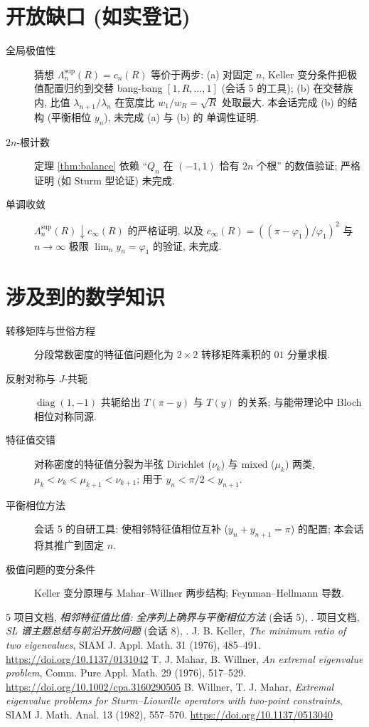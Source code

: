 \documentclass[UTF8]{ctexart}
\begin{document}
\section{开放缺口 (如实登记)}

\begin{description}
	\item[全局极值性] 猜想 $\Lambda_n^{\sup}(R) = c_n(R)$ 等价于两步:
		(a) 对固定 $n$, Keller 变分条件把极值配置归约到交替 bang-bang
		$[1,R,\dots,1]$ (会话 5 的工具); (b) 在交替族内, 比值
		$\lambda_{n+1}/\lambda_n$ 在宽度比 $w_1/w_R = \sqrt R$ 处取最大.
		本会话完成 (b) 的结构 (平衡相位 $y_n$), 未完成 (a) 与 (b) 的
		单调性证明.
	\item[$2n$-根计数] 定理 \ref{thm:balance} 依赖 ``$Q_n$ 在 $(-1,1)$
		恰有 $2n$ 个根'' 的数值验证; 严格证明 (如 Sturm 型论证) 未完成.
	\item[单调收敛] $\Lambda_n^{\sup}(R) \downarrow c_\infty(R)$ 的严格证明,
		以及 $c_\infty(R) = ((\pi-\varphi_1)/\varphi_1)^2$ 与 $n \to \infty$
		极限 $\lim_n y_n = \varphi_1$ 的验证, 未完成.
\end{description}

\section{涉及到的数学知识}

\begin{description}
	\item[转移矩阵与世俗方程] 分段常数密度的特征值问题化为 $2\times2$
		转移矩阵乘积的 $01$ 分量求根.
	\item[反射对称与 $J$-共轭] $\operatorname{diag}(1,-1)$ 共轭给出
		$T(\pi-y)$ 与 $T(y)$ 的关系; 与能带理论中 Bloch 相位对称同源.
	\item[特征值交错] 对称密度的特征值分裂为半弦 Dirichlet ($\nu_k$) 与
		mixed ($\mu_k$) 两类, $\mu_k < \nu_k < \mu_{k+1} < \nu_{k+1}$;
		用于 $y_n < \pi/2 < y_{n+1}$.
	\item[平衡相位方法] 会话 5 的自研工具: 使相邻特征值相位互补
		($y_n + y_{n+1} = \pi$) 的配置; 本会话将其推广到固定 $n$.
	\item[极值问题的变分条件] Keller 变分原理与 Mahar--Willner 两步结构;
		Feynman--Hellmann 导数.
\end{description}

\begin{thebibliography}{5}
 项目文档, \emph{相邻特征值比值: 全序列上确界与平衡相位方法}
	(会话 5), .
 项目文档, \emph{SL 谱主题总结与前沿开放问题} (会话 8),
	.
 J. B. Keller, \emph{The minimum ratio of two eigenvalues},
	SIAM J. Appl. Math. 31 (1976), 485--491. \url{https://doi.org/10.1137/0131042}
 T. J. Mahar, B. Willner, \emph{An extremal eigenvalue problem},
	Comm. Pure Appl. Math. 29 (1976), 517--529.
	\url{https://doi.org/10.1002/cpa.3160290505}
 B. Willner, T. J. Mahar, \emph{Extremal eigenvalue problems for
	Sturm--Liouville operators with two-point constraints}, SIAM J. Math. Anal.
	13 (1982), 557--570. \url{https://doi.org/10.1137/0513040}
\end{thebibliography}
\end{document}
